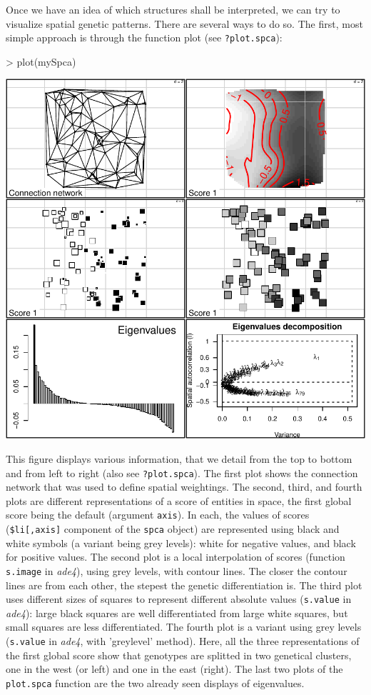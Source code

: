 \documentclass{article}
\begin{document}
Once we have an idea of which structures shall be interpreted, we can
try to visualize spatial genetic patterns.
There are several ways to do so.
The first, most simple approach is through the function plot (see \texttt{?plot.spca}):
\begin{Schunk}
\begin{Sinput}
> plot(mySpca)
\end{Sinput}
\end{Schunk}
\includegraphics{figs/spca-plotspca}


\noindent This figure displays various information, that we detail from
the top to bottom and from left to right (also see \texttt{?plot.spca}).
The first plot shows the connection network that was used to define
spatial weightings.
The second, third, and fourth plots are different representations of
a score of entities in space, the first global score being the default (argument
\texttt{axis}).
In each, the values of scores (\texttt{\$li[,axis]} component of the
\texttt{spca} object) are represented using black and white symbols
(a variant being grey levels): white for negative values, and black
for positive values.
The second plot is a local interpolation of scores (function
\texttt{s.image} in \textit{ade4}), using grey levels, with contour lines.
The closer the contour lines are from each other, the stepest the
genetic differentiation is.
The third plot uses different sizes of squares to represent different
absolute values (\texttt{s.value} in \textit{ade4}): large black squares are well differentiated from
large white squares, but small squares are less differentiated.
The fourth plot is a variant using grey levels (\texttt{s.value} in
\textit{ade4}, with 'greylevel' method).
Here, all the three representations of the first global score show
that genotypes are splitted in two genetical clusters, one in the west
(or left) and one in the east (right).
The last two plots of the \texttt{plot.spca} function are the two
already seen displays of eigenvalues.
\\
\end{document}
